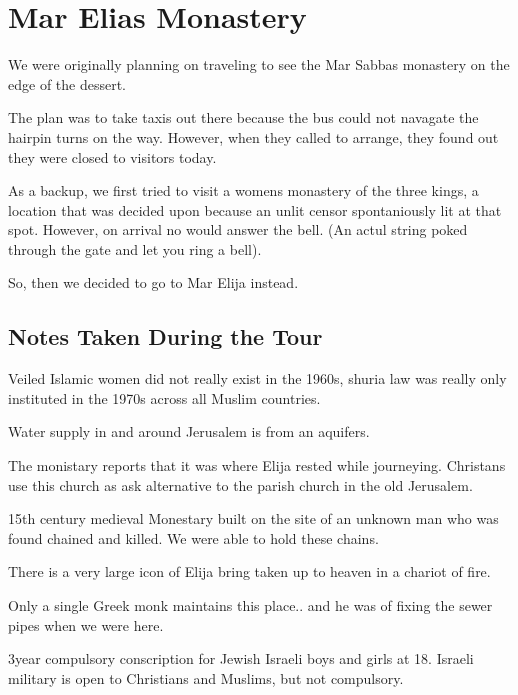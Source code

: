 \documentclass[letterpaper]{report}
\begin{document}
\section{Mar Elias Monastery}
\begin{multicols}{2}
We were originally planning on traveling to see the Mar Sabbas monastery on the edge of the dessert.

The plan was to take taxis out there because the bus could not navagate the hairpin turns on the way. However, when they called to arrange, they found out they were closed to visitors today.

As a backup, we first tried to visit a womens monastery of the three kings,
a location that was decided upon because an unlit censor spontaniously lit at that spot.
However, on arrival no would answer the bell. (An actul string poked through the gate and let you ring a bell).

So, then we decided to go to Mar Elija instead.

\subsection{Notes Taken During the Tour}
Veiled Islamic women did not really exist in the 1960s, shuria law was really only instituted in the 1970s across all Muslim countries.

Water supply in and around Jerusalem is from an aquifers.

The monistary reports that it was where Elija rested while journeying. Christans use this church as ask alternative to the parish church in the old Jerusalem. 

15th century medieval Monestary built on the site of an unknown man who was found chained and killed. We were able to hold these chains.

There is a very large icon of Elija bring taken up to heaven in a chariot of fire.

Only a single Greek monk maintains this place.. and he was of fixing the sewer pipes when we were here.

3year compulsory conscription for Jewish Israeli boys and girls at 18. Israeli military is open to Christians and Muslims, but not compulsory.
\end{multicols}
\end{document}
